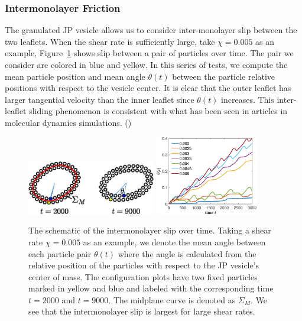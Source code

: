 \documentclass[lineno]{jfm}
\begin{document}
\subsubsection{Intermonolayer Friction}
The granulated JP vesicle allows us to consider inter-monolayer slip
between the two leaflets. When the shear rate is sufficiently large,
take $\chi = 0.005$ as an example, Figure~\ref{figure5} shows slip
between a pair of particles over time. The pair we consider are colored
in blue and yellow. In this series of tests, we compute the mean
particle position and mean angle $\theta(t)$ between the particle
relative positions with respect to the vesicle center. It is clear that
the outer leaflet has larger tangential velocity than the inner leaflet
since $\theta(t)$ increases. This inter-leaflet sliding phenomenon is
consistent with what has been seen in articles in molecular dynamics
simulations. (\cite{Zgorski2019,denOtter2007})


\begin{figure}
\begin{center}
\includegraphics[width=0.5\textwidth]{Slip.eps}
\includegraphics[width=0.4\textwidth]{Slip2.eps}
\end{center} 
  \caption{\label{figure5} The schematic of the intermonolayer slip over
  time. Taking a shear rate $\chi=0.005$ as an example, we denote the
  mean angle between each particle pair $\theta(t)$ where the angle is
  calculated from the relative position of the particles with respect to
  the JP vesicle's center of mass. The configuration plots have two
  fixed particles marked in yellow and blue and labeled with the
  corresponding time $t=2000$ and $t=9000$. The midplane curve is
  denoted as $\Sigma_M$. We see that the intermonolayer slip is largest
  for large shear rates.}
\end{figure}
\end{document}
